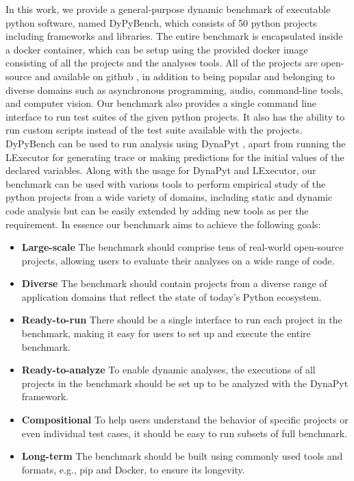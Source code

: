 In this work, we provide a general-purpose dynamic benchmark of executable python software, named DyPyBench, which consists of 50 python projects including frameworks and libraries. The entire benchmark is encapsulated inside a docker container, which can be setup using the provided docker image consisting of all the projects and the analyses tools. All of the projects are open-source and available on github \cite{github}, in addition to being popular and belonging to diverse domains such as asynchronous programming, audio, command-line tools, and computer vision. Our benchmark also provides a single command line interface to run test suites of the given python projects. It also has the ability to run custom scripts instead of the test suite available with the projects. DyPyBench can be used to run analysis using DynaPyt \cite{DynaPyt2022}, apart from running the LExecutor \cite{LExecutor_2023} for generating trace or making predictions for the initial values of the declared variables. Along with the  usage for DynaPyt and LExecutor, our benchmark can be used with various tools to perform empirical study of the python projects from a wide variety of domains, including static and dynamic code analysis but can be easily extended by adding new tools as per the requirement. In essence our benchmark aims to achieve the following goals:
\begin{itemize}
    \item \textbf{Large-scale} The benchmark should comprise tens of real-world open-source projects, allowing users to evaluate their analyses on a wide range of code.
    \item \textbf{Diverse} The benchmark should contain projects from a diverse range of application domains that reflect the state of today's Python ecosystem.
    \item \textbf{Ready-to-run} There should be a single interface to run each project in the benchmark, making it easy for users to set up and execute the entire benchmark.
    \item \textbf{Ready-to-analyze} To enable dynamic analyses, the executions of all projects in the benchmark should be set up to be analyzed with the DynaPyt framework.
    \item \textbf{Compositional} To help users understand the behavior of specific projects or even individual test cases, it should be easy to run subsets of full benchmark.
    \item \textbf{Long-term} The benchmark should be built using commonly used tools and formats, e.g., pip and Docker, to ensure its longevity.
\end{itemize}




